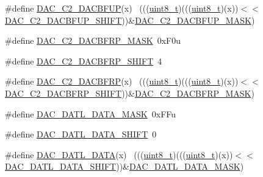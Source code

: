 \begin{DoxyCompactItemize}
\#define \hyperlink{group___d_a_c___register___masks_gad53572a2ce126813380890d433a76dfb}{D\+A\+C\+\_\+\+C2\+\_\+\+D\+A\+C\+B\+F\+UP}(x)                                            ~(((\hyperlink{_p_e___types_8h_aba7bc1797add20fe3efdf37ced1182c5}{uint8\+\_\+t})(((\hyperlink{_p_e___types_8h_aba7bc1797add20fe3efdf37ced1182c5}{uint8\+\_\+t})(x))$<$$<$\hyperlink{group___d_a_c___register___masks_ga5d43a79719748e490a572fa6cdc75efe}{D\+A\+C\+\_\+\+C2\+\_\+\+D\+A\+C\+B\+F\+U\+P\+\_\+\+S\+H\+I\+FT}))\&\hyperlink{group___d_a_c___register___masks_ga329015367026aaee34f54edcbaab61bb}{D\+A\+C\+\_\+\+C2\+\_\+\+D\+A\+C\+B\+F\+U\+P\+\_\+\+M\+A\+SK})
\item 
\#define \hyperlink{group___d_a_c___register___masks_ga64b53e5effabf2e736fca6088752e6ea}{D\+A\+C\+\_\+\+C2\+\_\+\+D\+A\+C\+B\+F\+R\+P\+\_\+\+M\+A\+SK}~0x\+F0u
\item 
\#define \hyperlink{group___d_a_c___register___masks_ga0ab880f693c25ecf491d3b76df611456}{D\+A\+C\+\_\+\+C2\+\_\+\+D\+A\+C\+B\+F\+R\+P\+\_\+\+S\+H\+I\+FT}~4
\item 
\#define \hyperlink{group___d_a_c___register___masks_ga754cc2916d174990b54658380eaf0adc}{D\+A\+C\+\_\+\+C2\+\_\+\+D\+A\+C\+B\+F\+RP}(x)                                            ~(((\hyperlink{_p_e___types_8h_aba7bc1797add20fe3efdf37ced1182c5}{uint8\+\_\+t})(((\hyperlink{_p_e___types_8h_aba7bc1797add20fe3efdf37ced1182c5}{uint8\+\_\+t})(x))$<$$<$\hyperlink{group___d_a_c___register___masks_ga0ab880f693c25ecf491d3b76df611456}{D\+A\+C\+\_\+\+C2\+\_\+\+D\+A\+C\+B\+F\+R\+P\+\_\+\+S\+H\+I\+FT}))\&\hyperlink{group___d_a_c___register___masks_ga64b53e5effabf2e736fca6088752e6ea}{D\+A\+C\+\_\+\+C2\+\_\+\+D\+A\+C\+B\+F\+R\+P\+\_\+\+M\+A\+SK})
\item 
\#define \hyperlink{group___d_a_c___register___masks_ga1874318b69ed4b2d190e887ed43e39bf}{D\+A\+C\+\_\+\+D\+A\+T\+L\+\_\+\+D\+A\+T\+A\+\_\+\+M\+A\+SK}~0x\+F\+Fu
\item 
\#define \hyperlink{group___d_a_c___register___masks_ga3c93e96482e5e842d2232a78bcdefa17}{D\+A\+C\+\_\+\+D\+A\+T\+L\+\_\+\+D\+A\+T\+A\+\_\+\+S\+H\+I\+FT}~0
\item 
\#define \hyperlink{group___d_a_c___register___masks_ga2923650bda04d892a226840bdadaeec7}{D\+A\+C\+\_\+\+D\+A\+T\+L\+\_\+\+D\+A\+TA}(x)                                              ~(((\hyperlink{_p_e___types_8h_aba7bc1797add20fe3efdf37ced1182c5}{uint8\+\_\+t})(((\hyperlink{_p_e___types_8h_aba7bc1797add20fe3efdf37ced1182c5}{uint8\+\_\+t})(x))$<$$<$\hyperlink{group___d_a_c___register___masks_ga3c93e96482e5e842d2232a78bcdefa17}{D\+A\+C\+\_\+\+D\+A\+T\+L\+\_\+\+D\+A\+T\+A\+\_\+\+S\+H\+I\+FT}))\&\hyperlink{group___d_a_c___register___masks_ga1874318b69ed4b2d190e887ed43e39bf}{D\+A\+C\+\_\+\+D\+A\+T\+L\+\_\+\+D\+A\+T\+A\+\_\+\+M\+A\+SK})
$$
\end{DoxyCompactItemize}

